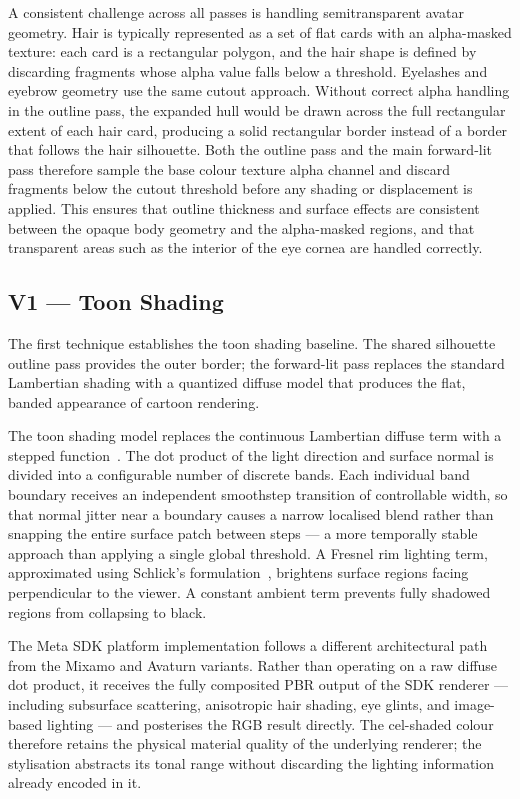 A consistent challenge across all passes is handling semitransparent avatar geometry. Hair is typically represented as a set of flat cards with an alpha-masked texture: each card is a rectangular polygon, and the hair shape is defined by discarding fragments whose alpha value falls below a threshold. Eyelashes and eyebrow geometry use the same cutout approach. Without correct alpha handling in the outline pass, the expanded hull would be drawn across the full rectangular extent of each hair card, producing a solid rectangular border instead of a border that follows the hair silhouette. Both the outline pass and the main forward-lit pass therefore sample the base colour texture alpha channel and discard fragments below the cutout threshold before any shading or displacement is applied. This ensures that outline thickness and surface effects are consistent between the opaque body geometry and the alpha-masked regions, and that transparent areas such as the interior of the eye cornea are handled correctly.

\subsection{V1 — Toon Shading}
\label{sec:v1}

The first technique establishes the toon shading baseline. The shared silhouette outline pass provides the outer border; the forward-lit pass replaces the standard Lambertian shading with a quantized diffuse model that produces the flat, banded appearance of cartoon rendering.

The toon shading model replaces the continuous Lambertian diffuse term with a stepped function~\cite{gooch1998}. The dot product of the light direction and surface normal is divided into a configurable number of discrete bands. Each individual band boundary receives an independent smoothstep transition of controllable width, so that normal jitter near a boundary causes a narrow localised blend rather than snapping the entire surface patch between steps — a more temporally stable approach than applying a single global threshold. A Fresnel rim lighting term, approximated using Schlick's formulation~\cite{schlick1994}, brightens surface regions facing perpendicular to the viewer. A constant ambient term prevents fully shadowed regions from collapsing to black.

The Meta SDK platform implementation follows a different architectural path from the Mixamo and Avaturn variants. Rather than operating on a raw diffuse dot product, it receives the fully composited PBR output of the SDK renderer — including subsurface scattering, anisotropic hair shading, eye glints, and image-based lighting — and posterises the RGB result directly. The cel-shaded colour therefore retains the physical material quality of the underlying renderer; the stylisation abstracts its tonal range without discarding the lighting information already encoded in it.

